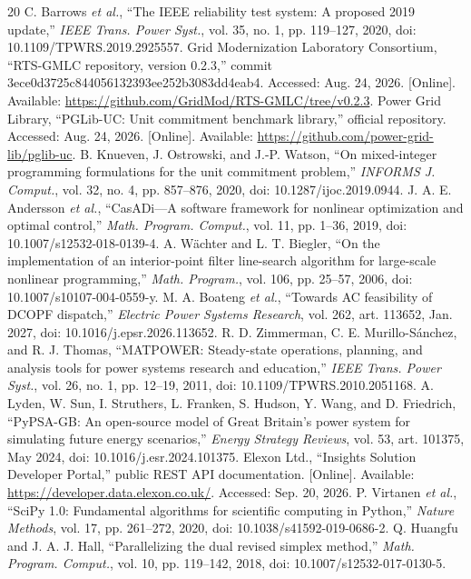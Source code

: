 \begin{thebibliography}{20}
 C. Barrows \emph{et al.}, ``The IEEE reliability test system: A proposed 2019 update,'' \emph{IEEE Trans. Power Syst.}, vol. 35, no. 1, pp. 119--127, 2020, doi: 10.1109/TPWRS.2019.2925557.
 Grid Modernization Laboratory Consortium, ``RTS-GMLC repository, version 0.2.3,'' commit 3ece0d3725c844056132393ee252b3083dd4eab4. Accessed: Aug. 24, 2026. [Online]. Available: \url{https://github.com/GridMod/RTS-GMLC/tree/v0.2.3}.
 Power Grid Library, ``PGLib-UC: Unit commitment benchmark library,'' official repository. Accessed: Aug. 24, 2026. [Online]. Available: \url{https://github.com/power-grid-lib/pglib-uc}.
 B. Knueven, J. Ostrowski, and J.-P. Watson, ``On mixed-integer programming formulations for the unit commitment problem,'' \emph{INFORMS J. Comput.}, vol. 32, no. 4, pp. 857--876, 2020, doi: 10.1287/ijoc.2019.0944.
 J. A. E. Andersson \emph{et al.}, ``CasADi---A software framework for nonlinear optimization and optimal control,'' \emph{Math. Program. Comput.}, vol. 11, pp. 1--36, 2019, doi: 10.1007/s12532-018-0139-4.
 A. W\"achter and L. T. Biegler, ``On the implementation of an interior-point filter line-search algorithm for large-scale nonlinear programming,'' \emph{Math. Program.}, vol. 106, pp. 25--57, 2006, doi: 10.1007/s10107-004-0559-y.
 M. A. Boateng \emph{et al.}, ``Towards AC feasibility of DCOPF dispatch,'' \emph{Electric Power Systems Research}, vol. 262, art. 113652, Jan. 2027, doi: 10.1016/j.epsr.2026.113652.
 R. D. Zimmerman, C. E. Murillo-S\'anchez, and R. J. Thomas, ``MATPOWER: Steady-state operations, planning, and analysis tools for power systems research and education,'' \emph{IEEE Trans. Power Syst.}, vol. 26, no. 1, pp. 12--19, 2011, doi: 10.1109/TPWRS.2010.2051168.
 A. Lyden, W. Sun, I. Struthers, L. Franken, S. Hudson, Y. Wang, and D. Friedrich, ``PyPSA-GB: An open-source model of Great Britain's power system for simulating future energy scenarios,'' \emph{Energy Strategy Reviews}, vol. 53, art. 101375, May 2024, doi: 10.1016/j.esr.2024.101375.
 Elexon Ltd., ``Insights Solution Developer Portal,'' public REST API documentation. [Online]. Available: \url{https://developer.data.elexon.co.uk/}. Accessed: Sep. 20, 2026.
 P. Virtanen \emph{et al.}, ``SciPy 1.0: Fundamental algorithms for scientific computing in Python,'' \emph{Nature Methods}, vol. 17, pp. 261--272, 2020, doi: 10.1038/s41592-019-0686-2.
 Q. Huangfu and J. A. J. Hall, ``Parallelizing the dual revised simplex method,'' \emph{Math. Program. Comput.}, vol. 10, pp. 119--142, 2018, doi: 10.1007/s12532-017-0130-5.
\end{thebibliography}
